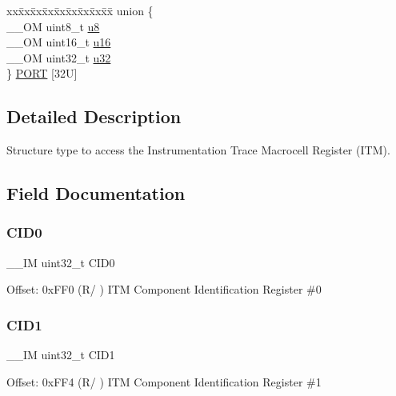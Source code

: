\begin{DoxyCompactItemize}
\item 
\begin{tabbing}
xx\=xx\=xx\=xx\=xx\=xx\=xx\=xx\=xx\=\kill
union \{\\
\>\_\_OM uint8\_t \mbox{\hyperlink{struct_i_t_m___type_a4c0550e859d614c607bd4b575f05425c}{u8}}\\
\>\_\_OM uint16\_t \mbox{\hyperlink{struct_i_t_m___type_ae93660eefe2482a8564fae9a1ca39739}{u16}}\\
\>\_\_OM uint32\_t \mbox{\hyperlink{struct_i_t_m___type_ae89dd50f788f12863c681fba1a5b60d1}{u32}}\\
\} \mbox{\hyperlink{struct_i_t_m___type_a41f63a3ff33f1644c1f5e2fc1d48181c}{PORT}} \mbox{[}32U\mbox{]}\\

\end{tabbing}\end{DoxyCompactItemize}


\subsection{Detailed Description}
Structure type to access the Instrumentation Trace Macrocell Register (I\+TM). 

\subsection{Field Documentation}
\mbox{\label{struct_i_t_m___type_a26bbad5d9e0f1d302611d52373aef839}} 
\subsubsection{\texorpdfstring{CID0}{CID0}}
{\footnotesize\ttfamily \+\_\+\+\_\+\+IM uint32\+\_\+t C\+I\+D0}

Offset\+: 0x\+F\+F0 (R/ ) I\+TM Component Identification Register \#0 \mbox{\label{struct_i_t_m___type_a4e60a608afd6433ecd943d95e417b80b}} 
\subsubsection{\texorpdfstring{CID1}{CID1}}
{\footnotesize\ttfamily \+\_\+\+\_\+\+IM uint32\+\_\+t C\+I\+D1}

Offset\+: 0x\+F\+F4 (R/ ) I\+TM Component Identification Register \#1 \mbox{\label{struct_i_t_m___type_ad98950702e55d1851e91b22de07b11aa}} 
